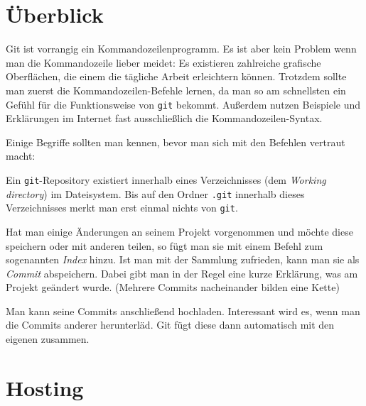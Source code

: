 %
%
%

\section{Überblick}


Git ist vorrangig ein Kommandozeilenprogramm.
Es ist aber kein Problem wenn man die Kommandozeile lieber meidet: Es existieren zahlreiche grafische Oberflächen, die einem die tägliche Arbeit erleichtern können.
Trotzdem sollte man zuerst die Kommandozeilen-Befehle lernen, da man so am schnellsten ein Gefühl für die Funktionsweise von \texttt{git} bekommt.
Außerdem nutzen Beispiele und Erklärungen im Internet fast ausschließlich die Kommandozeilen-Syntax.

Einige Begriffe sollten man kennen, bevor man sich mit den Befehlen vertraut macht:

Ein \texttt{git}-Repository existiert innerhalb eines Verzeichnisses (dem \textit{Working directory}) im Dateisystem.
Bis auf den Ordner \verb|.git| innerhalb dieses Verzeichnisses merkt man erst einmal nichts von \texttt{git}.

Hat man einige Änderungen an seinem Projekt vorgenommen und möchte diese speichern oder mit anderen teilen, so fügt man sie mit einem Befehl zum sogenannten \textit{Index} hinzu.
Ist man mit der Sammlung zufrieden, kann man sie als \textit{Commit} abspeichern.
Dabei gibt man in der Regel eine kurze Erklärung, was am Projekt geändert wurde.
(Mehrere Commits nacheinander bilden eine Kette)

Man kann seine Commits anschließend hochladen.
Interessant wird es, wenn man die Commits anderer herunterläd.
Git fügt diese dann automatisch mit den eigenen zusammen.

\section{Hosting}

